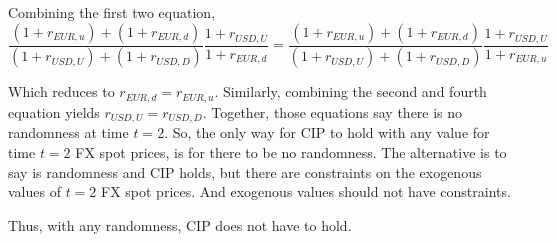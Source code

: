 Combining the first two equation, 
\[ \frac {(1+r_{EUR,u}) + (1+r_{EUR,d})}{(1+r_{USD,U}) + (1+r_{USD,D})}\frac{1+r_{USD,U}}{1+r_{EUR,d}} = \frac {(1+r_{EUR,u}) + (1+r_{EUR,d})}{(1+r_{USD,U}) + (1+r_{USD,D})}\frac{1+r_{USD,U}}{1+r_{EUR,u}} \]

Which reduces to $r_{EUR,d} =r_{EUR,u}$.   Similarly, combining the second and fourth equation yields $r_{USD,U} = r_{USD,D}$.  Together, those equations say there is no randomness at time $t=2$.  So, the only way for CIP to hold with any value for time $t=2$ FX spot prices, is for there to be no randomness.  The alternative is to say is randomness and CIP holds, but there are constraints on the exogenous values of $t=2$ FX spot prices.  And exogenous values should not have constraints.  

Thus, with any randomness, CIP does not have to hold.

